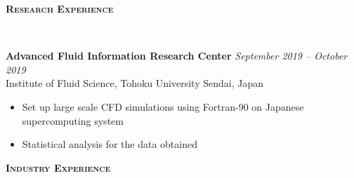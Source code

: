 \documentclass[letterpaper, 10pt]{article}
\newenvironment{changemargin}[2]{%
  \begin{list}{}{%
      \setlength{\topsep}{0pt}%
      \setlength{\leftmargin}{#1}%
      \setlength{\rightmargin}{#2}%
      \setlength{\listparindent}{\parindent}%
      \setlength{\itemindent}{\parindent}%
      \setlength{\parsep}{\parskip}%
    }%
  \item[]}{\end{list}
}
\newcommand{\lineover}{
  \begin{changemargin}{-0.05in}{-0.05in}
    \vspace*{-8pt}
    \hrulefill \\
    \vspace*{-2pt}
  \end{changemargin}
}
\newcommand{\header}[1]{
  \begin{changemargin}{-0.5in}{-0.5in}
    \textbf{\scshape{#1}}\\
    \lineover
  \end{changemargin}
}
\newenvironment{body} {
  \vspace*{-16pt}
  \begin{changemargin}{-0.25in}{-0.5in}
  }
  {\end{changemargin}
}
\begin{document}
\header{Research Experience}
\begin{body}
	\vspace{14pt}
	
	\textbf{Advanced Fluid Information Research Center}\hfill
	\emph{September 2019 -- October 2019} \\
	Institute of Fluid Science, Tohoku University   \hfill Sendai, Japan
	\vspace{-2pt}
	\begin{itemize}
		\setlength{\itemindent}{0in}
		\setlength{\itemsep}{0in}
		\item Set up large scale CFD simulations using Fortran-90 on Japanese supercomputing system 
		\item Statistical analysis for the data obtained
	\end{itemize}

	
	
\end{body}
\smallskip
\header{Industry Experience}
\end{document}
